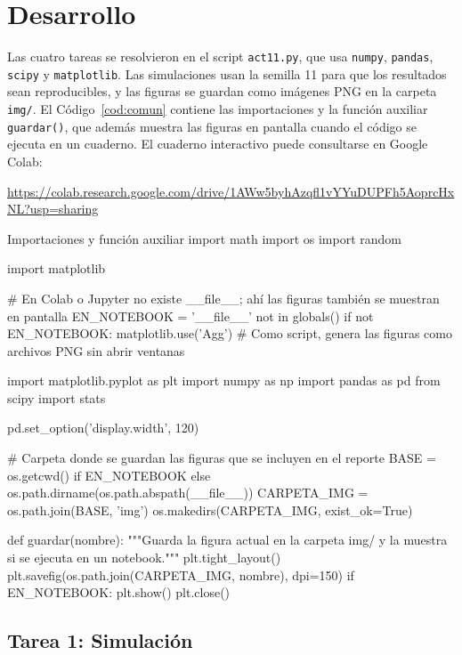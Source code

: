 \documentclass[11pt,letterpaper]{article}
\begin{document}
\section{Desarrollo}

Las cuatro tareas se resolvieron en el script \texttt{act11.py}, que usa \texttt{numpy}, \texttt{pandas}, \texttt{scipy} y \texttt{matplotlib}. Las simulaciones usan la semilla 11 para que los resultados sean reproducibles, y las figuras se guardan como imágenes PNG en la carpeta \texttt{img/}. El Código~\ref{cod:comun} contiene las importaciones y la función auxiliar \texttt{guardar()}, que además muestra las figuras en pantalla cuando el código se ejecuta en un cuaderno. El cuaderno interactivo puede consultarse en Google Colab:

\begin{center}
    \url{https://colab.research.google.com/drive/1AWw5byhAzqfl1vYYuDUPFh5AoprcHxNL?usp=sharing}
\end{center}

\begin{codigo}[label=cod:comun]{Importaciones y función auxiliar}
import math
import os
import random

import matplotlib

# En Colab o Jupyter no existe __file__; ahí las figuras también se muestran en pantalla
EN_NOTEBOOK = '__file__' not in globals()
if not EN_NOTEBOOK:
    matplotlib.use('Agg')  # Como script, genera las figuras como archivos PNG sin abrir ventanas

import matplotlib.pyplot as plt
import numpy as np
import pandas as pd
from scipy import stats

pd.set_option('display.width', 120)

# Carpeta donde se guardan las figuras que se incluyen en el reporte
BASE = os.getcwd() if EN_NOTEBOOK else os.path.dirname(os.path.abspath(__file__))
CARPETA_IMG = os.path.join(BASE, 'img')
os.makedirs(CARPETA_IMG, exist_ok=True)


def guardar(nombre):
    """Guarda la figura actual en la carpeta img/ y la muestra si se ejecuta en un notebook."""
    plt.tight_layout()
    plt.savefig(os.path.join(CARPETA_IMG, nombre), dpi=150)
    if EN_NOTEBOOK:
        plt.show()
    plt.close()
\end{codigo}

\subsection{Tarea 1: Simulación}
\end{document}
